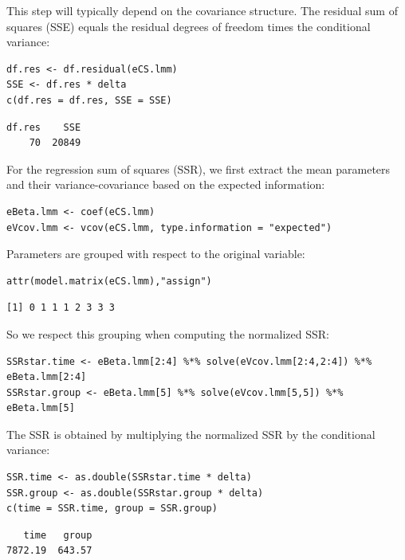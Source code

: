 \documentclass[12pt]{article}
\begin{document}
This step will typically depend on the covariance structure. The
residual sum of squares (SSE) equals the residual degrees of freedom
times the conditional variance:
\lstset{language=r,label= ,caption= ,captionpos=b,numbers=none}
\begin{lstlisting}
df.res <- df.residual(eCS.lmm)
SSE <- df.res * delta
c(df.res = df.res, SSE = SSE)
\end{lstlisting}

\begin{verbatim}
df.res    SSE 
    70  20849
\end{verbatim}


For the regression sum of squares (SSR), we first extract the mean
parameters and their variance-covariance based on the expected
information:
\lstset{language=r,label= ,caption= ,captionpos=b,numbers=none}
\begin{lstlisting}
eBeta.lmm <- coef(eCS.lmm)
eVcov.lmm <- vcov(eCS.lmm, type.information = "expected")
\end{lstlisting}

Parameters are grouped with respect to the original variable:
\lstset{language=r,label= ,caption= ,captionpos=b,numbers=none}
\begin{lstlisting}
attr(model.matrix(eCS.lmm),"assign")
\end{lstlisting}

\begin{verbatim}
[1] 0 1 1 1 2 3 3 3
\end{verbatim}


\bigskip

So we respect this grouping when computing the normalized SSR: 
\lstset{language=r,label= ,caption= ,captionpos=b,numbers=none}
\begin{lstlisting}
SSRstar.time <- eBeta.lmm[2:4] %*% solve(eVcov.lmm[2:4,2:4]) %*% eBeta.lmm[2:4] 
SSRstar.group <- eBeta.lmm[5] %*% solve(eVcov.lmm[5,5]) %*% eBeta.lmm[5] 
\end{lstlisting}
The SSR is obtained by multiplying the normalized SSR by the
conditional variance:
\lstset{language=r,label= ,caption= ,captionpos=b,numbers=none}
\begin{lstlisting}
SSR.time <- as.double(SSRstar.time * delta)
SSR.group <- as.double(SSRstar.group * delta)
c(time = SSR.time, group = SSR.group)
\end{lstlisting}
\begin{verbatim}
   time   group 
7872.19  643.57
\end{verbatim}
\end{document}
